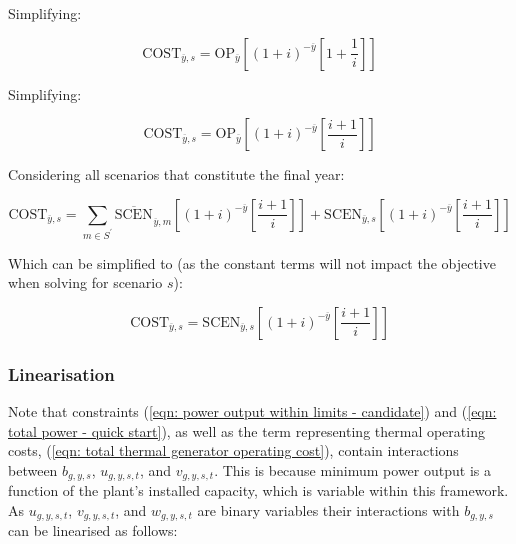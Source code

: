 \documentclass{article}
\newcommand{\sScenarios}{S}
\newcommand{\iGenerator}{g}
\newcommand{\iYear}{y}
\newcommand{\iYearTerminal}{\overline{\iYear}}
\newcommand{\iScenario}{s}
\newcommand{\iScenarioAlias}{m}
\newcommand{\iInterval}{t}
\newcommand{\cOperatingCost}[1][\iYear,\iScenario]{\mathrm{OP}_{#1}}
\newcommand{\cInterestRate}{i}
\newcommand{\cObjectiveFunction}{\mathrm{COST}}
\newcommand{\cOperatingCostScenario}[1][\iYear,\iScenario]{\mathrm{SCEN}_{#1}}
\newcommand{\vStartupIndicator}[1][\iGenerator,\iYear,\iScenario,\iInterval]{v_{#1}}
\newcommand{\vShutdownIndicator}[1][\iGenerator,\iYear,\iScenario,\iInterval]{w_{#1}}
\newcommand{\vOnIndicator}[1][\iGenerator,\iYear,\iScenario,\iInterval]{u_{#1}}
\newcommand{\vInstalledCapacityTotalScenario}[1][\iGenerator,\iYear,\iScenario]{b_{#1}}
\begin{document}
Simplifying:

\begin{equation}
	\cObjectiveFunction_{\iYearTerminal,\iScenario} = \cOperatingCost[\iYearTerminal] \left[(1+\cInterestRate)^{-\iYearTerminal} \left[1 + \frac{1}{\cInterestRate}\right]\right]
\end{equation}

Simplifying:

\begin{equation}
	\cObjectiveFunction_{\iYearTerminal,\iScenario} = \cOperatingCost[\iYearTerminal] \left[(1+\cInterestRate)^{-\iYearTerminal} \left[ \frac{\cInterestRate + 1}{\cInterestRate}\right]\right]
\end{equation}

Considering all scenarios that constitute the final year:

\begin{equation}
	\cObjectiveFunction_{\iYearTerminal,\iScenario} = \sum\limits_{\iScenarioAlias \in \sScenarios^{\prime}} \overline{\cOperatingCostScenario[]}_{\iYearTerminal,\iScenarioAlias} \left[(1+\cInterestRate)^{-\iYearTerminal} \left[\frac{\cInterestRate + 1}{\cInterestRate}\right]\right] + \cOperatingCostScenario[\iYearTerminal,\iScenario] \left[(1+\cInterestRate)^{-\iYearTerminal} \left[\frac{\cInterestRate + 1}{\cInterestRate}\right]\right] 
\end{equation}

Which can be simplified to (as the constant terms will not impact the objective when solving for scenario $\iScenario$):

\begin{equation}
\cObjectiveFunction_{\iYearTerminal,\iScenario} = \cOperatingCostScenario[\iYearTerminal,\iScenario] \left[(1+\cInterestRate)^{-\iYearTerminal} \left[\frac{\cInterestRate + 1}{\cInterestRate}\right]\right] 
\end{equation}

\subsubsection{Linearisation}
Note that constraints (\ref{eqn: power output within limits - candidate}) and (\ref{eqn: total power - quick start}), as well as the term representing thermal operating costs, (\ref{eqn: total thermal generator operating cost}), contain interactions between $\vInstalledCapacityTotalScenario$, $\vOnIndicator$, and $\vStartupIndicator$. This is because minimum power output is a function of the plant's installed capacity, which is variable within this framework. As $\vOnIndicator$, $\vStartupIndicator$, and $\vShutdownIndicator$ are binary variables their interactions with $\vInstalledCapacityTotalScenario$ can be linearised as follows:
\end{document}
